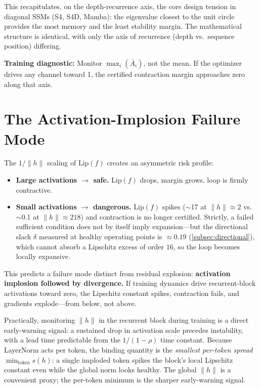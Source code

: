 \documentclass[11pt]{article}
\begin{document}
This recapitulates, on the depth-recurrence axis, the core design tension in diagonal SSMs (S4, S4D, Mamba): the eigenvalue closest to the unit circle provides the most memory and the least stability margin. The mathematical structure is identical, with only the axis of recurrence (depth vs.\ sequence position) differing.

\textbf{Training diagnostic:} Monitor $\max_i(\bar{A}_i)$, not the mean. If the optimizer drives any channel toward 1, the certified contraction margin approaches zero along that axis.


\section{The Activation-Implosion Failure Mode}
\label{sec:implosion}

The $1/\|h\|$ scaling of $\text{Lip}(f)$ creates an asymmetric risk profile:

\begin{itemize}
    \item \textbf{Large activations $\to$ safe.} $\text{Lip}(f)$ drops, margin grows, loop is firmly contractive.
    \item \textbf{Small activations $\to$ dangerous.} $\text{Lip}(f)$ spikes ($\sim$17 at $\|h\|\approx 2$ vs.\ $\sim$0.1 at $\|h\|\approx 218$) and contraction is no longer certified. Strictly, a failed sufficient condition does not by itself imply expansion---but the directional slack $\delta$ measured at healthy operating points is $\approx 0.19$ (\cref{subsec:directional}), which cannot absorb a Lipschitz excess of order $16$, so the loop becomes locally expansive.
\end{itemize}

This predicts a failure mode distinct from residual explosion: \textbf{activation implosion followed by divergence.} If training dynamics drive recurrent-block activations toward zero, the Lipschitz constant spikes, contraction fails, and gradients explode---from below, not above.

Practically, monitoring $\|h\|$ in the recurrent block during training is a direct early-warning signal: a sustained drop in activation scale precedes instability, with a lead time predictable from the $1/(1-\rho)$ time constant. Because LayerNorm acts per token, the binding quantity is the \emph{smallest per-token spread} $\min_{\text{token}} s(h)$: a single imploded token spikes the block's local Lipschitz constant even while the global norm looks healthy. The global $\|h\|$ is a convenient proxy; the per-token minimum is the sharper early-warning signal.
\end{document}
